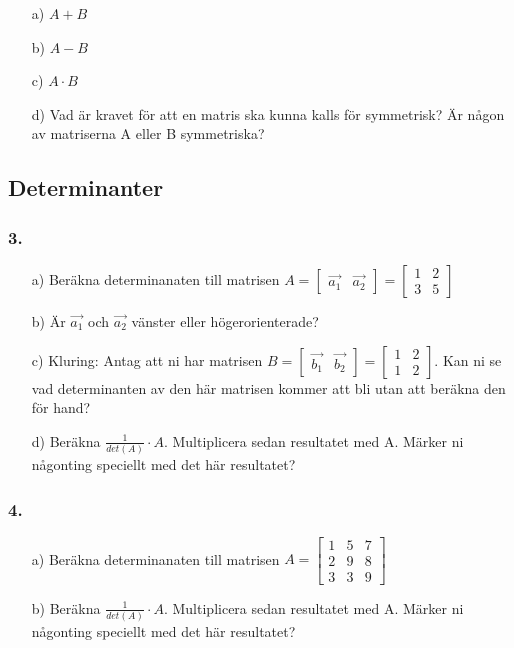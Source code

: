 \documentclass{article}
\begin{document}
\begin{itemize}
	\item[a) ] $A+B$
	\item[b) ] $A-B$
	\item[c) ] $A \cdot B$
	\item[d) ] Vad är kravet för att en matris ska kunna kalls för symmetrisk? Är någon av matriserna A eller B symmetriska?
\end{itemize}

\subsection*{Determinanter}
\subsubsection*{3.}
\begin{itemize}
	\item[a) ] Beräkna determinanaten till matrisen $A = \begin{bmatrix} \vec{a_1} & \vec{a_2}\end{bmatrix} =\begin{bmatrix}1 & 2 \\ 3 & 5\end{bmatrix}$
	\item[b) ] Är $\vec{a_1}$ och $\vec{a_2}$ vänster eller högerorienterade?
	\item[c) ] Kluring: Antag att ni har matrisen $B = \begin{bmatrix} \vec{b_1} & \vec{b_2}\end{bmatrix} =\begin{bmatrix}1 & 2 \\ 1 & 2\end{bmatrix}$. Kan ni se vad determinanten av den här matrisen kommer att bli utan att beräkna den för hand?
	\item[d) ] Beräkna $\frac{1}{det(A)} \cdot A$. Multiplicera sedan resultatet med A. Märker ni någonting speciellt med det här resultatet?
\end{itemize}

\subsubsection*{4.}
\begin{itemize}
	\item[a) ] Beräkna determinanaten till matrisen $A=\begin{bmatrix}1 & 5 & 7\\ 2 & 9 & 8 \\ 3 & 3 & 9\end{bmatrix}$ 
	\item[b) ] Beräkna $\frac{1}{det(A)} \cdot A$. Multiplicera sedan resultatet med A. Märker ni någonting speciellt med det här resultatet?
\end{itemize}
\end{document}
